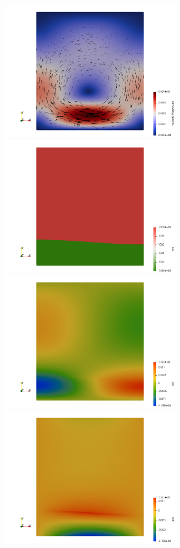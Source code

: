 \begin{center}
\includegraphics[width=7.5cm]{python_codes/fieldstone_25/results/vel}
\includegraphics[width=7.5cm]{python_codes/fieldstone_25/results/rho}\\
\includegraphics[width=7.5cm]{python_codes/fieldstone_25/results/exx}
\includegraphics[width=7.5cm]{python_codes/fieldstone_25/results/exy}\\

\end{center}
